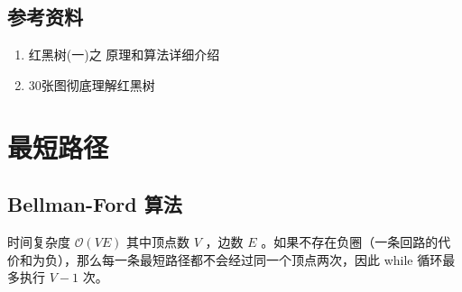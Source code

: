 \documentclass[letterpaper,10pt,english]{sphinxmanual}
\begin{document}
\subsection{参考资料}
\label{\detokenize{mathematicsAlgorithm/02_redblackTree:id2}}\begin{enumerate}
\item {} 
红黑树(一)之 原理和算法详细介绍

\end{enumerate}
\begin{quote}

\end{quote}
\begin{enumerate}
\setcounter{enumi}{1}
\item {} 
30张图彻底理解红黑树

\end{enumerate}
\begin{quote}

\end{quote}


\section{最短路径}
\label{\detokenize{mathematicsAlgorithm/03_shortestPath::doc}}\label{\detokenize{mathematicsAlgorithm/03_shortestPath:id1}}

\subsection{Bellman-Ford 算法}
\label{\detokenize{mathematicsAlgorithm/03_shortestPath:bellman-ford}}
时间复杂度 \(\mathcal{O}(VE)\) 其中顶点数 \(V\) ，边数 \(E\) 。如果不存在负圈（一条回路的代价和为负），那么每一条最短路径都不会经过同一个顶点两次，因此 while 循环最多执行 \(V-1\) 次。
\end{document}

